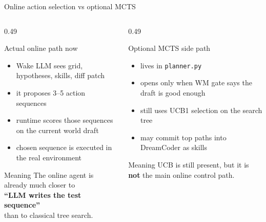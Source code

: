 \documentclass[aspectratio=169]{beamer}
\begin{document}
\begin{frame}{Online action selection vs optional MCTS}
\small
\begin{columns}[T,totalwidth=\textwidth]
\begin{column}{0.49\textwidth}
\begin{block}{Actual online path now}
\begin{itemize}
\item Wake LLM sees grid, hypotheses, skills, diff patch
\item it proposes 3--5 action sequences
\item runtime scores those sequences on the current world draft
\item chosen sequence is executed in the real environment
\end{itemize}
\end{block}
\begin{block}{Meaning}
The online agent is already much closer to\\
\textbf{``LLM writes the test sequence''}\\
than to classical tree search.
\end{block}
\end{column}
\begin{column}{0.49\textwidth}
\begin{block}{Optional MCTS side path}
\begin{itemize}
\item lives in \texttt{planner.py}
\item opens only when WM gate says the draft is good enough
\item still uses UCB1 selection on the search tree
\item may commit top paths into DreamCoder as skills
\end{itemize}
\end{block}
\begin{block}{Meaning}
UCB is still present, but it is \textbf{not} the main online control path.
\end{block}
\end{column}
\end{columns}
\end{frame}
\end{document}
